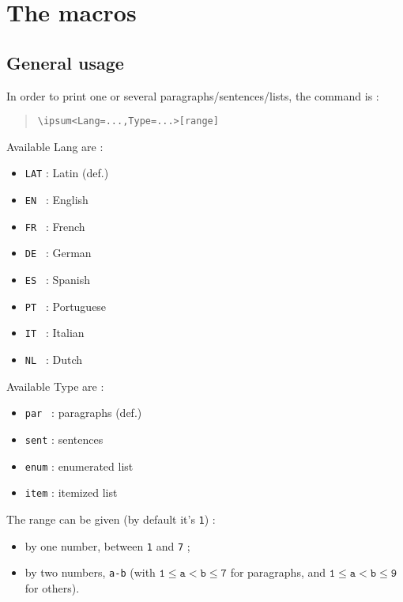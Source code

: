 \documentclass[11pt,a4paper]{ltxdoc}
\begin{document}
\pagebreak

\section{The macros}

\subsection{General usage}

In order to print one or several paragraphs/sentences/lists, the command is :

\begin{quote}
\begin{verbatim}
\ipsum<Lang=...,Type=...>[range]
\end{verbatim}
\end{quote}

Available \textsf{Lang} are :

\begin{multicols}{4}
	\begin{itemize}
		\item \texttt{LAT} : Latin (def.)
		\item \texttt{EN~} : English
		\item \texttt{FR~} : French
		\item \texttt{DE~} : German
		\item \texttt{ES~} : Spanish
		\item \texttt{PT~} : Portuguese
		\item \texttt{IT~} : Italian
		\item \texttt{NL~} : Dutch
	\end{itemize}
\end{multicols}

Available \textsf{Type} are :

\begin{multicols}{2}
	\begin{itemize}
		\item \texttt{par~} : paragraphs (def.)
		\item \texttt{sent} : sentences
		\item \texttt{enum} : enumerated list
		\item \texttt{item} : itemized list
	\end{itemize}
\end{multicols}

The \textsf{range} can be given (by default it's \texttt{1}) :

\begin{itemize}
	\item by one number, between \texttt{1} and \texttt{7} ;
	\item by two numbers, \texttt{a-b} (with $\mathtt{1 \leq a < b \leq 7}$ for paragraphs, and $\mathtt{1 \leq a < b \leq 9}$ for others).
\end{itemize}
\end{document}
